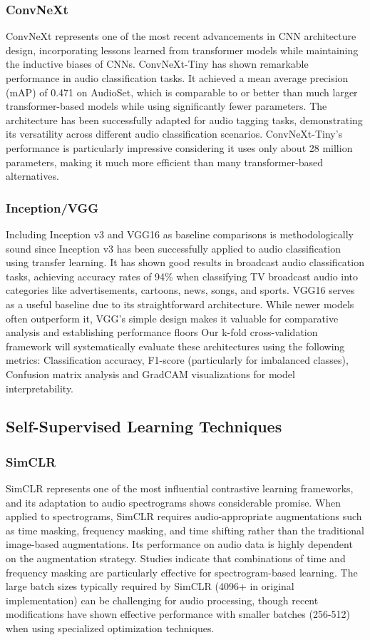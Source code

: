 \documentclass[11pt]{article}
\begin{document}
\subsubsection{ConvNeXt}
ConvNeXt represents one of the most recent advancements in CNN architecture design, incorporating lessons learned from transformer models while maintaining the inductive biases of CNNs. ConvNeXt-Tiny has shown remarkable performance in audio classification tasks. It achieved a mean average precision (mAP) of 0.471 on AudioSet, which is comparable to or better than much larger transformer-based models while using significantly fewer parameters. The architecture has been successfully adapted for audio tagging tasks, demonstrating its versatility across different audio classification scenarios. ConvNeXt-Tiny's performance is particularly impressive considering it uses only about 28 million parameters, making it much more efficient than many transformer-based alternatives.
\subsubsection{Inception/VGG}
Including Inception v3 and VGG16 as baseline comparisons is methodologically sound since Inception v3 has been successfully applied to audio classification using transfer learning. It has shown good results in broadcast audio classification tasks, achieving accuracy rates of 94\% when classifying TV broadcast audio into categories like advertisements, cartoons, news, songs, and sports. VGG16 serves as a useful baseline due to its straightforward architecture. While newer models often outperform it, VGG's simple design makes it valuable for comparative analysis and establishing performance floors
Our k-fold cross-validation framework will systematically evaluate these architectures using the following metrics: Classification accuracy, F1-score (particularly for imbalanced classes), Confusion matrix analysis and GradCAM visualizations for model interpretability.

\subsection{Self-Supervised Learning Techniques}
\subsubsection{SimCLR}
SimCLR represents one of the most influential contrastive learning frameworks, and its adaptation to audio spectrograms shows considerable promise. When applied to spectrograms, SimCLR requires audio-appropriate augmentations such as time masking, frequency masking, and time shifting rather than the traditional image-based augmentations. Its performance on audio data is highly dependent on the augmentation strategy. Studies indicate that combinations of time and frequency masking are particularly effective for spectrogram-based learning. The large batch sizes typically required by SimCLR (4096+ in original implementation) can be challenging for audio processing, though recent modifications have shown effective performance with smaller batches (256-512) when using specialized optimization techniques.
\end{document}
